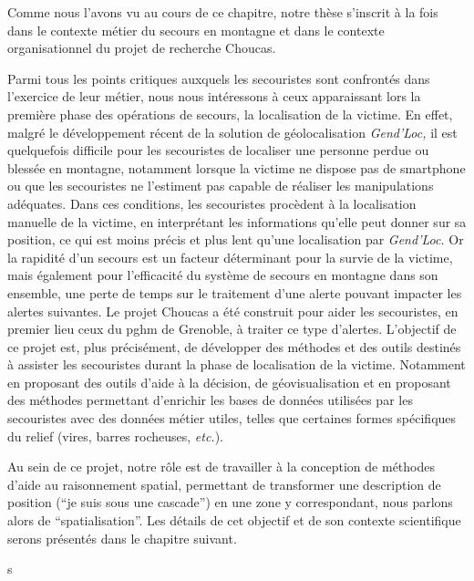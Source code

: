 Comme nous l'avons vu au cours de ce chapitre, notre thèse s'inscrit à
la fois dans le contexte métier du secours en montagne et dans
le contexte organisationnel du projet de recherche Choucas.

Parmi tous les points critiques auxquels les secouristes sont
confrontés dans l'exercice de leur métier, nous nous intéressons à
ceux apparaissant lors la première phase des opérations de secours, la
localisation de la victime. En effet, malgré le développement récent
de la solution de géolocalisation \emph{Gend'Loc,} il est quelquefois
difficile pour les secouristes de localiser une personne perdue ou
blessée en montagne, notamment lorsque la victime ne dispose pas de
smartphone ou que les secouristes ne l'estiment pas capable de
réaliser les manipulations adéquates. Dans ces conditions, les
secouristes procèdent à la localisation manuelle de la victime, en
interprétant les informations qu'elle peut donner sur sa position, ce
qui est moins précis et plus lent qu'une localisation par
\emph{Gend'Loc.} Or la rapidité d'un secours est un facteur
déterminant pour la survie de la victime, mais également pour
l'efficacité du système de secours en montagne dans son ensemble, une
perte de temps sur le traitement d'une alerte pouvant impacter les
alertes suivantes. Le projet Choucas a été construit pour aider les
secouristes, en premier lieu ceux du \ac{pghm} de Grenoble, à traiter
ce type d'alertes. L'objectif de ce projet est, plus précisément, de
développer des méthodes et des outils destinés à assister les
secouristes durant la phase de localisation de la victime. Notamment
en proposant des outils d'aide à la décision, de géovisualisation et
en proposant des méthodes permettant d'enrichir les bases de données
utilisées par les secouristes avec des données métier utiles, telles
que certaines formes spécifiques du relief (\eg vires, barres
rocheuses, \emph{etc.}).

Au sein de ce projet, notre rôle est de travailler à la conception de
méthodes d'aide au raisonnement spatial, permettant de transformer une
description de position (\eg \enquote{je suis sous une cascade}) en
une zone y correspondant, nous parlons alors de
\enquote{spatialisation}. Les détails de cet objectif et de son
contexte scientifique serons présentés dans le chapitre suivant.

s

